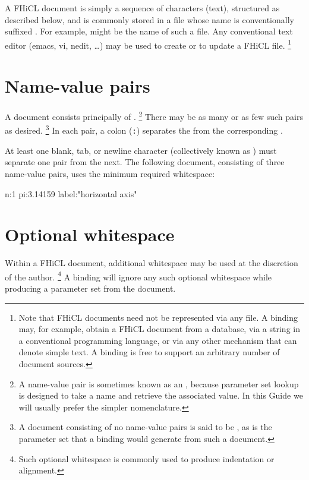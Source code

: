 \documentclass[draftmode,draftwater]{memarticle}
\newcommand{\fhicl}%
 {FHiCL\xspace}
\begin{document}
A \fhicl document is simply a sequence of characters
(\ie text),
structured as described below,
and is commonly stored in a file
whose name is conventionally suffixed .
For example,
 might be the name of such a file.
Any conventional text editor
(\eg emacs, vi, nedit, \ldots)
may be used to create or to update a \fhicl file.%
\footnote{%
  Note that \fhicl documents
  need not be represented via any file.
  A binding may, for example,
  obtain a \fhicl document
  from a database,
  via a string in a conventional programming language,
  or
  via any other mechanism that can denote simple text.
  A binding is free
  to support an arbitrary number
  of document sources.%
}

\section{Name-value pairs}

A document consists principally
of .%
\footnote{%
  A name-value pair is sometimes known
  as an ,
  because parameter set lookup
  is designed to take a name
  and retrieve the associated value.
  In this Guide
  we will usually prefer the simpler  nomenclature.%
}
There may be as many or as few such pairs
as desired.%
\footnote{%
  A document consisting of no name-value pairs
  is said to be ,
  as is the parameter set
  that a binding would generate
  from such a document.%
}
In each pair,
a colon (\verb|:|) separates the 
from the corresponding .

At least one blank, tab, or newline character
(collectively known as )
must separate one pair from the next.
The following document,
consisting of three name-value pairs,
uses the minimum required whitespace:
\Needspace{.17in}
\begin{fcllisting}[texcl,escapechar=`]
n:1 pi:3.14159 label:"horizontal axis"
\end{fcllisting}

\section{Optional whitespace}

Within a \fhicl document,
additional whitespace
may be used
at the discretion of the author.%
\footnote{%
  Such optional whitespace
  is commonly used
  to produce indentation or alignment.%
}
A binding will ignore
any such optional whitespace
while producing a parameter set
from the document.
\end{document}
